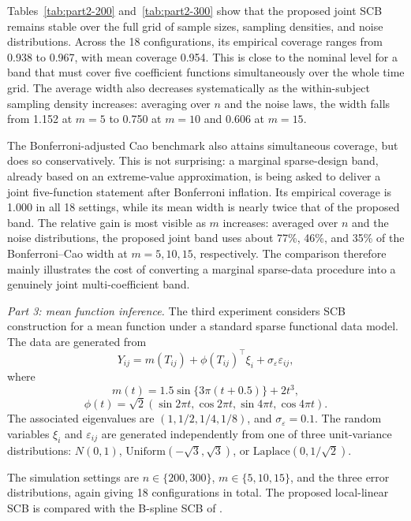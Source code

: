 Tables~\ref{tab:part2-200} and~\ref{tab:part2-300} show that the proposed
joint SCB remains stable over the full grid of sample sizes, sampling
densities, and noise distributions. Across the 18 configurations, its empirical
coverage ranges from 0.938 to 0.967, with mean coverage 0.954. This is close to
the nominal level for a band that must cover five coefficient functions
simultaneously over the whole time grid. The average width also decreases
systematically as the within-subject sampling density increases: averaging over
\(n\) and the noise laws, the width falls from 1.152 at \(m=5\) to 0.750 at
\(m=10\) and 0.606 at \(m=15\).

The Bonferroni-adjusted Cao benchmark also attains simultaneous coverage, but
does so conservatively. This is not surprising: a marginal sparse-design band,
already based on an extreme-value approximation, is being asked to deliver a
joint five-function statement after Bonferroni inflation. Its empirical
coverage is 1.000 in all 18 settings, while its mean width is nearly twice that
of the proposed band. The relative gain is most visible as \(m\) increases:
averaged over \(n\) and the noise distributions, the proposed joint band uses
about 77\%, 46\%, and 35\% of the Bonferroni--Cao width at \(m=5,10,15\),
respectively. The comparison therefore mainly illustrates the cost of
converting a marginal sparse-data procedure into a genuinely joint
multi-coefficient band.

\emph{Part 3: mean function inference.}
The third experiment considers SCB construction for a mean function under a
standard sparse functional data model. The data are generated from
\begin{equation}
\label{eq:part3-dgp}
Y_{ij}=m(T_{ij})+\phi(T_{ij})^\top\xi_i+
\sigma_\varepsilon\varepsilon_{ij},
\end{equation}
where
\[
m(t)=1.5\sin\{3\pi(t+0.5)\}+2t^3,
\]
\[
\phi(t)=\sqrt2(\sin2\pi t,\cos2\pi t,\sin4\pi t,\cos4\pi t).
\]
The associated eigenvalues are \((1,1/2,1/4,1/8)\), and
\(\sigma_\varepsilon=0.1\). The random variables \(\xi_i\) and
\(\varepsilon_{ij}\) are generated independently from one of three
unit-variance distributions: \(N(0,1)\),
\(\mathrm{Uniform}(-\sqrt3,\sqrt3)\), or
\(\mathrm{Laplace}(0,1/\sqrt2)\).

The simulation settings are \(n\in\{200,300\}\),
\(m\in\{5,10,15\}\), and the three error distributions, again giving 18
configurations in total. The proposed local-linear SCB is compared with the
B-spline SCB of \citet{CaiHu2025}.

